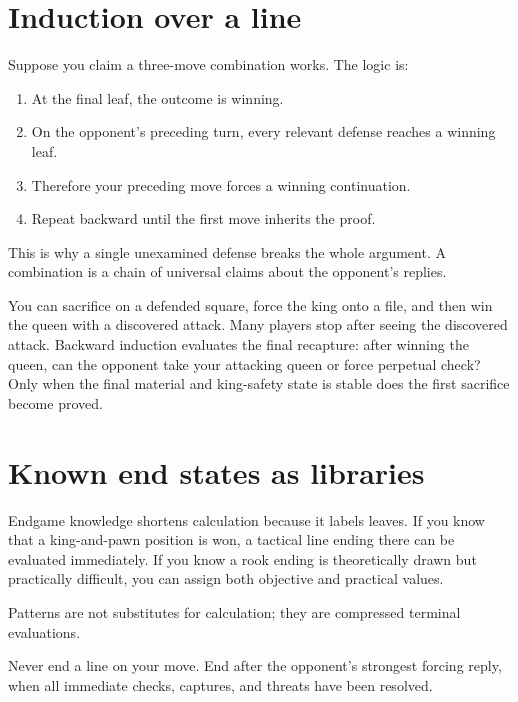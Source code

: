 \section{Induction over a line}
Suppose you claim a three-move combination works. The logic is:

\begin{enumerate}[leftmargin=1.4em]
\item At the final leaf, the outcome is winning.
\item On the opponent's preceding turn, every relevant defense reaches a winning leaf.
\item Therefore your preceding move forces a winning continuation.
\item Repeat backward until the first move inherits the proof.
\end{enumerate}

This is why a single unexamined defense breaks the whole argument. A combination is a chain of universal claims about the opponent's replies.

\begin{workedbox}[title={Worked example: calculate the recapture last}]
You can sacrifice on a defended square, force the king onto a file, and then win the queen with a discovered attack. Many players stop after seeing the discovered attack. Backward induction evaluates the final recapture: after winning the queen, can the opponent take your attacking queen or force perpetual check? Only when the final material and king-safety state is stable does the first sacrifice become proved.
\end{workedbox}

\section{Known end states as libraries}
Endgame knowledge shortens calculation because it labels leaves. If you know that a king-and-pawn position is won, a tactical line ending there can be evaluated immediately. If you know a rook ending is theoretically drawn but practically difficult, you can assign both objective and practical values.

Patterns are not substitutes for calculation; they are compressed terminal evaluations.

\begin{warningbox}
Never end a line on your move. End after the opponent's strongest forcing reply, when all immediate checks, captures, and threats have been resolved.
\end{warningbox}

